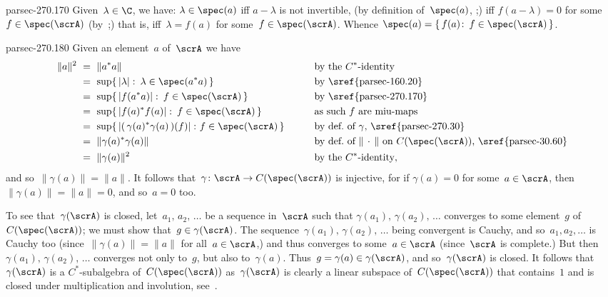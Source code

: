 \documentclass[b5page]{book}
\begin{document}
\begin{solution}{parsec-270.170}
Given~$\lambda\in\C$,
we have: $\lambda\in \spec(a)$
iff $a-\lambda$ is not invertible,
(by definition of~$\spec(a)$, ;)
iff $f(a-\lambda)=0$ for some~$f\in \spec(\scrA)$
(by~;)
that is, iff~$\lambda=f(a)$ for some~$f\in \spec(\scrA)$.
Whence $\spec(a)=\{\,f(a)\colon\, f\in \spec(\scrA)\,\}$.
\end{solution}
\begin{solution}{parsec-270.180}
Given an  element~$a$ of~$\scrA$
we have
\begin{alignat*}{3}
\|a\|^2  \ &=\ \|a^*a\|
&& \text{by the $C^*$-identity}\\
\ &=\  \sup\{\, \left|\lambda\right|\colon\, 
\lambda\in\spec(a^*a)\,\}
&&\text{by~\sref{parsec-160.20}}\\
\ &=\  \sup\{\, \left|f(a^*a)\right|\colon\, 
f\in\spec(\scrA)\,\}
&&\text{by~\sref{parsec-270.170}}
\\
\ &=\  \sup\{\, \left|f(a)^*f(a)\right|\colon\, 
f\in\spec(\scrA)\,\}
&&\text{as such~$f$ are miu-maps}\\
\ &=\  \sup\{\, \left|(\,\gamma(a)^*\gamma(a)\,)(f)\right|\colon
f\in \spec(\scrA)\,\}
\qquad&&\text{by def.~of~$\gamma$, \sref{parsec-270.30}} \\
\ &=\ \|\gamma(a)^*\gamma(a)\|&&
\text{by def.~of~$\|\,\cdot\,\|$ on~$C(\spec(\scrA))$,
\sref{parsec-30.60}}\\
\ &=\ \|\gamma(a)\|^2
&&\text{by the $C^*$-identity},
\end{alignat*}
and so~$\|\gamma(a)\|=\|a\|$.
It follows that~$\gamma\colon \scrA\to C(\spec(\scrA))$
is injective,
for if $\gamma(a)=0$ for some~$a\in\scrA$,
then~$\|\gamma(a)\|=\|a\|=0$,
and so~$a=0$ too.

To see that~$\gamma(\scrA)$ is closed,
let~$a_1,\,a_2,\,\dotsc$
be a sequence in~$\scrA$
such that $\gamma(a_1),\,\gamma(a_2),\,\dotsc$
converges to some element~$g$ of~$C(\spec(\scrA))$;
we must show that~$g\in\gamma(\scrA)$.
The sequence~$\gamma(a_1),\,\gamma(a_2),\,\dotsc$
being convergent is Cauchy,
and so~$a_1,a_2,\dotsc$ is Cauchy too
(since~$\|\gamma(a)\|=\|a\|$ for all~$a\in\scrA$,)
and thus converges to some~$a\in\scrA$
(since~$\scrA$ is complete.)
But then~$\gamma(a_1),\,\gamma(a_2),\,\dotsc$
converges not only to~$g$, but also to~$\gamma(a)$.
Thus~$g=\gamma(a)\in\gamma(\scrA)$,
and so~$\gamma(\scrA)$
is closed.
It follows that~$\gamma(\scrA)$ is a $C^*$-subalgebra of~$C(\spec(\scrA))$
as~$\gamma(\scrA)$ is clearly a linear subspace
of~$C(\spec(\scrA))$
that contains~$1$ and is closed under multiplication and involution,
see~.
\end{solution}
\end{document}
